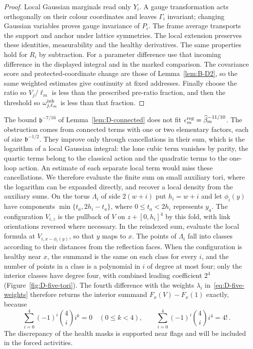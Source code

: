 \begin{proof}
Local Gaussian marginals read only $Y_i$. A gauge transformation acts orthogonally on their colour coordinates and leaves $\Gamma_i$ invariant; changing Gaussian variables proves gauge invariance of $P_i$. The frame average transports the support and anchor under lattice symmetries. The local extension preserves these identities, measurability and the healthy derivatives. The same properties hold for $R_i$ by subtraction. For a parameter difference use that incoming difference in the displayed integral and in the marked comparison. The covariance score and protected-coordinate change are those of Lemma~\ref{lem:B-D2}, so the same weighted estimates give continuity at fixed addresses. Finally choose the ratio so $V_j/\ell_m$ is less than the prescribed pre-ratio fraction, and then the threshold so $\omega_{j,\ell_m}^{\rm inh}$ is less than that fraction.
\end{proof}

The bound $\mathfrak b^{-7/16}$ of Lemma~\ref{lem:D-connected} does not fit $\epsilon_m^{\rm reg}=\widehat{\beta}_m^{-11/10}$. The obstruction comes from connected terms with one or two elementary factors, each of size $\mathfrak b^{-1/2}$. They improve only through cancellations in their sum, which is the logarithm of a local Gaussian integral: the lone cubic term vanishes by parity, the quartic terms belong to the classical action and the quadratic terms to the one-loop action. An estimate of each separate local term would miss these cancellations. We therefore evaluate the finite sum on small auxiliary tori, where the logarithm can be expanded directly, and recover a local density from the auxiliary sums. On the torus $\Lambda_i$ of side $2(w+i)$ put $h_i=w+i$ and let $\phi_i(y)$ have components $\min\{t_a,2h_i-t_a\}$, where $0\le t_a<2h_i$ represents $y_a$. The configuration $V_{i,z}$ is the pullback of $V$ on $z+[0,h_i]^4$ by this fold, with link orientations reversed where necessary. In the reindexed sum, evaluate the local formula at $V_{i,x-\phi_i(y)}$, so that $y$ maps to $x$. The points of $\Lambda_i$ fall into classes according to their distances from the reflection faces. When the configuration is healthy near $x$, the summand is the same on each class for every $i$, and the number of points in a class is a polynomial in $i$ of degree at most four; only the interior classes have degree four, with combined leading coefficient $2^4$ (Figure~\ref{fig:D-five-tori}). The fourth difference with the weights $\lambda_i$ in~\eqref{eq:D-five-weights} therefore returns the interior summand $F_x(V)-F_x(1)$ exactly, because
\begin{equation*}
\sum_{i=0}^4(-1)^i\binom4i i^k=0\quad(0\le k<4),\qquad
\sum_{i=0}^4(-1)^i\binom4i i^4=4!\,.
\end{equation*}
The discrepancy of the health masks is supported near flags and will be included in the forced activities.

